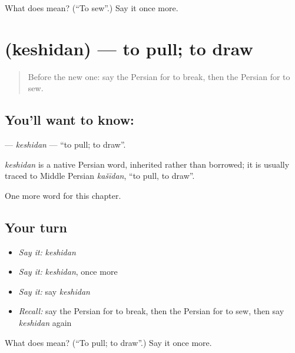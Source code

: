 \begin{tcolorbox}[breakable,colback=teal!4,colframe=teal!35!black,title={Before you move on}]
What does  mean? (\textquotedblleft{}To sew\textquotedblright{}.) Say it once more.
\end{tcolorbox}
\section[\texorpdfstring{\fa{کشیدن} (keshidan)}{کشیدن (keshidan)}]{ (keshidan) — to pull; to draw}

\label{lesson:FA-C132-keshidan}



\begin{quote}
Before the new one: say the Persian for to break, then the Persian for to sew.
\end{quote}

\subsection*{You'll want to know: }
\textbf{} — \emph{keshidan} — \textquotedblleft{}to pull; to draw\textquotedblright{}.

\begin{cousinweb}
\emph{keshidan} is a native Persian word, inherited rather than borrowed; it is usually traced to Middle Persian \emph{kašīdan}, \textquotedblleft{}to pull, to draw\textquotedblright{}.
\end{cousinweb}

\begin{grammarlens}[title={What you've built}]
One more word for this chapter.
\end{grammarlens}

\subsection*{Your turn}
\begin{itemize}
\raggedright
  \item \emph{Say it:} \emph{keshidan}
  \item \emph{Say it:} \emph{keshidan}, once more
  \item \emph{Say it:} say \emph{keshidan}
  \item \emph{Recall:} say the Persian for to break, then the Persian for to sew, then say \emph{keshidan} again
\end{itemize}

\begin{tcolorbox}[breakable,colback=teal!4,colframe=teal!35!black,title={Before you move on}]
What does  mean? (\textquotedblleft{}To pull; to draw\textquotedblright{}.) Say it once more.
\end{tcolorbox}
